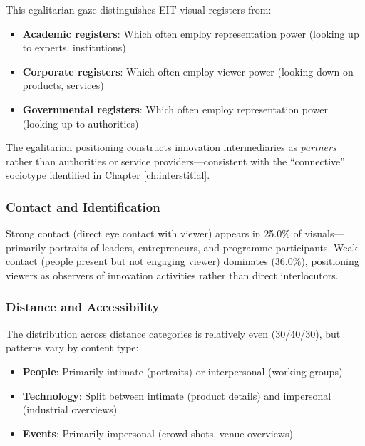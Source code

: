 \documentclass[../main.tex]{subfiles}
\begin{document}
This egalitarian gaze distinguishes EIT visual registers from:
\begin{itemize}
    \item \textbf{Academic registers}: Which often employ representation power (looking up to experts, institutions)
    \item \textbf{Corporate registers}: Which often employ viewer power (looking down on products, services)
    \item \textbf{Governmental registers}: Which often employ representation power (looking up to authorities)
\end{itemize}

The egalitarian positioning constructs innovation intermediaries as \textit{partners} rather than authorities or service providers---consistent with the ``connective'' sociotype identified in Chapter \ref{ch:interstitial}.

\subsubsection{Contact and Identification}

Strong contact (direct eye contact with viewer) appears in 25.0\% of visuals---primarily portraits of leaders, entrepreneurs, and programme participants. Weak contact (people present but not engaging viewer) dominates (36.0\%), positioning viewers as observers of innovation activities rather than direct interlocutors.

\subsubsection{Distance and Accessibility}

The distribution across distance categories is relatively even (30/40/30), but patterns vary by content type:

\begin{itemize}
    \item \textbf{People}: Primarily intimate (portraits) or interpersonal (working groups)
    \item \textbf{Technology}: Split between intimate (product details) and impersonal (industrial overviews)
    \item \textbf{Events}: Primarily impersonal (crowd shots, venue overviews)
\end{itemize}
\end{document}
